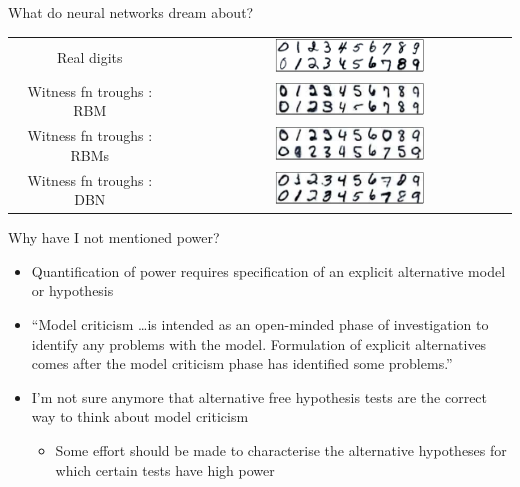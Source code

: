 \begin{frame}{What do neural networks dream about?}
  \begin{center}
    \begin{tabular}{ccc}
      Real digits & $\,$ & \includegraphics[width=0.48\textwidth]{figures/many_rbm_cond_witness_peaks} \\
      \pause
      Witness fn troughs : RBM & $\,$ & \includegraphics[width=0.48\textwidth]{figures/rbm_witness_troughs} \\
      \pause
      Witness fn troughs : RBMs & $\,$ & \includegraphics[width=0.48\textwidth]{figures/many_rbm_cond_witness_troughs} \\
      \pause
      Witness fn troughs : DBN & $\,$ & \includegraphics[width=0.48\textwidth]{figures/dbn_ft_cond_witness_troughs} \\
    \end{tabular}
  \end{center}
\end{frame}

\begin{frame}{Why have I not mentioned power?}
  \begin{itemize}
    \item Quantification of power requires specification of an explicit alternative model or hypothesis
    \vspace{\baselineskip}
    \pause
    \item ``Model criticism \dots is intended as an open-minded phase of investigation
to identify any problems with the model. Formulation of explicit alternatives
comes after the model criticism phase has identified some problems.'' \cite{OHagan2003-bc}
    \vspace{\baselineskip}
    \pause
    \item I'm not sure anymore that alternative free hypothesis tests are the correct way to think about model criticism
    \begin{itemize}
      \item Some effort should be made to characterise the alternative hypotheses for which certain tests have high power
    \end{itemize}
  \end{itemize}
\end{frame}

